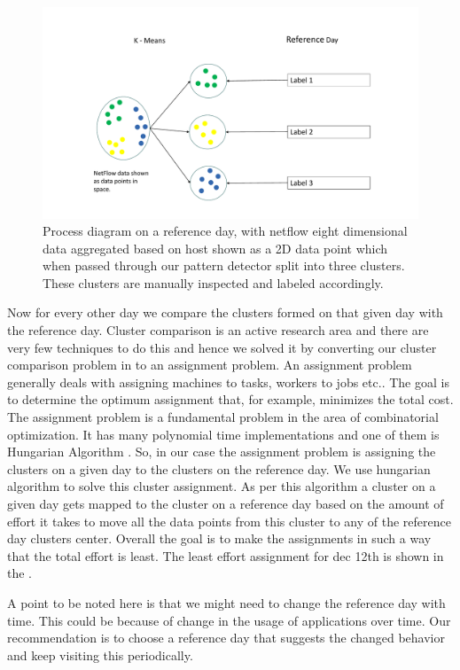 \begin{figure}[b]
	\centerline{\includegraphics[scale = 0.5]{cluster_comp.pdf}}
	\caption{Process diagram on a reference day, with netflow eight dimensional data aggregated based on host shown as a 2D data point which when passed through our pattern detector split into three clusters. These clusters are manually inspected and labeled accordingly. }%
\end{figure}

 Now for every other day we compare the clusters formed on that given day with the reference day. Cluster comparison is an active research area and there are very few techniques to do this and hence we solved it by converting our cluster comparison problem in to an assignment problem. An assignment problem generally deals with assigning machines to tasks, workers to jobs etc.. The goal is to determine the optimum assignment that, for example, minimizes the total cost. The assignment problem is a fundamental problem in the area of combinatorial optimization. It has many polynomial time implementations and one of them is Hungarian Algorithm \cite{}. So, in our case the assignment problem is assigning the clusters on a given day to the clusters on the reference day. We use hungarian algorithm to solve this cluster assignment. As per this algorithm a cluster on a given day gets mapped to the cluster on a reference day based on the amount of effort it takes to move all the data points from this cluster to any of the reference day clusters center. Overall the goal is to make the assignments in such a way that the total effort is least. The least effort assignment for dec 12th is shown in the .
 

A point to be noted here is that we might need to change the reference day with time. This could be because of change in the usage of applications over time. Our recommendation is to choose a reference day that suggests the changed behavior and keep visiting this periodically.

